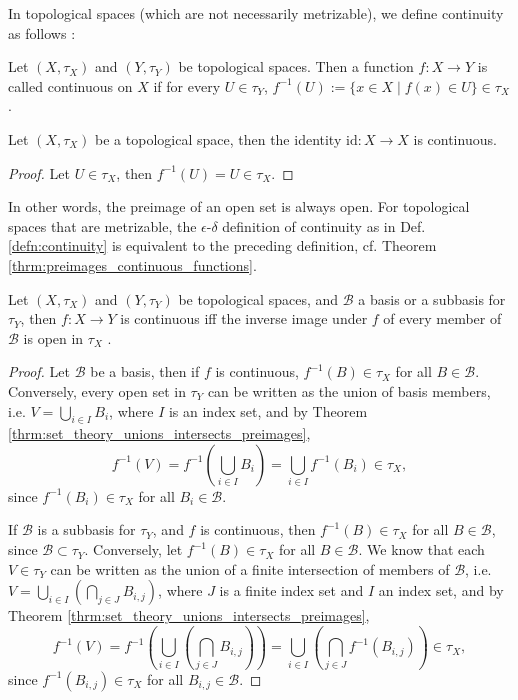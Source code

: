 In topological spaces (which are not necessarily metrizable), we define continuity as follows \cite{topology-singh}:

\begin{defn}\label{defn:continuity_topological_spaces}
	Let $(X, \tau_X)$ and $(Y, \tau_Y)$ be topological spaces. Then a function $f: X \to Y$ is called continuous on $X$ if for every $U\in \tau_Y$, $f^{-1}(U) := \{ x\in X \mid f(x)\in U \} \in \tau_X$.
\end{defn}

\begin{exmp}
	Let $(X, \tau_X)$ be a topological space, then the identity $\text{id}: X\to X$ is continuous.
\end{exmp}

\begin{proof}
	Let $U\in \tau_X$, then $f^{-1}(U) = U\in\tau_X$.
\end{proof}

\begin{remark}
	In other words, the preimage of an open set is always open. For topological spaces that are metrizable, the $\epsilon$-$\delta$ definition of continuity as in Def. \ref{defn:continuity} is equivalent to the preceding definition, cf. Theorem \ref{thrm:preimages_continuous_functions}.
\end{remark}

\begin{theorem}\label{thrm:continuity_sub_basis}
	Let $(X, \tau_X)$ and $(Y, \tau_Y)$ be topological spaces, and $\mathscr B$ a basis or a subbasis for $\tau_Y$, then $f: X\to Y$ is continuous iff the inverse image under $f$ of every member of $\mathscr B$ is open in $\tau_X$ \cite{topology-singh}. 
\end{theorem}

\begin{proof}
	Let $\mathscr B$ be a basis, then if $f$ is continuous, $f^{-1}(B)\in\tau_X$ for all $B\in \mathscr B$. Conversely, every open set in $\tau_Y$ can be written as the union of basis members, i.e. $V = \bigcup_{i\in I}B_i$, where $I$ is an index set, and by Theorem \ref{thrm:set_theory_unions_intersects_preimages}, $$f^{-1}(V) = f^{-1}\left(\bigcup_{i\in I}B_i\right) = \bigcup_{i\in I}f^{-1}(B_i)\in \tau_X,$$ since $f^{-1}(B_i)\in\tau_X$ for all $B_i\in\mathscr B$.
	
	If $\mathscr B$ is a subbasis for $\tau_Y$, and $f$ is continuous, then $f^{-1}(B)\in \tau_X$ for all $B\in\mathscr B$, since $\mathscr B\subset \tau_Y$. Conversely, let $f^{-1}(B) \in \tau_X$ for all $B\in\mathscr B$. We know that each $V\in \tau_Y$ can be written as the union of a finite intersection of members of $\mathscr B$, i.e. $V = \bigcup_{i\in I}\left(\bigcap_{j\in J}B_{i, j}\right)$, where $J$ is a finite index set and $I$ an index set, and by Theorem \ref{thrm:set_theory_unions_intersects_preimages},
	$$f^{-1}(V) = f^{-1}\left(\bigcup_{i\in I}\left(\bigcap_{j\in J}B_{i, j}\right)\right) = \bigcup_{i\in I}\left(\bigcap_{j\in J}f^{-1}(B_{i, j})\right)\in \tau_X,$$
	since $f^{-1}(B_{i, j})\in \tau_X$ for all $B_{i, j}\in \mathscr B$.
\end{proof}

